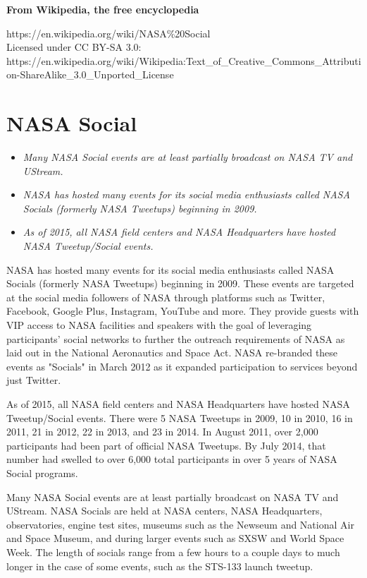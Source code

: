 \textbf{From Wikipedia, the free encyclopedia}

https://en.wikipedia.org/wiki/NASA\%20Social\\
Licensed under CC BY-SA 3.0:\\
https://en.wikipedia.org/wiki/Wikipedia:Text\_of\_Creative\_Commons\_Attribution-ShareAlike\_3.0\_Unported\_License

\section{NASA Social}\label{nasa-social}

\begin{itemize}
\item
  \emph{Many NASA Social events are at least partially broadcast on NASA
  TV and UStream.}
\item
  \emph{NASA has hosted many events for its social media enthusiasts
  called NASA Socials (formerly NASA Tweetups) beginning in 2009.}
\item
  \emph{As of 2015, all NASA field centers and NASA Headquarters have
  hosted NASA Tweetup/Social events.}
\end{itemize}

NASA has hosted many events for its social media enthusiasts called NASA
Socials (formerly NASA Tweetups) beginning in 2009. These events are
targeted at the social media followers of NASA through platforms such as
Twitter, Facebook, Google Plus, Instagram, YouTube and more. They
provide guests with VIP access to NASA facilities and speakers with the
goal of leveraging participants' social networks to further the outreach
requirements of NASA as laid out in the National Aeronautics and Space
Act. NASA re-branded these events as "Socials" in March 2012 as it
expanded participation to services beyond just Twitter.

As of 2015, all NASA field centers and NASA Headquarters have hosted
NASA Tweetup/Social events. There were 5 NASA Tweetups in 2009, 10 in
2010, 16 in 2011, 21 in 2012, 22 in 2013, and 23 in 2014. In August
2011, over 2,000 participants had been part of official NASA Tweetups.
By July 2014, that number had swelled to over 6,000 total participants
in over 5 years of NASA Social programs.

Many NASA Social events are at least partially broadcast on NASA TV and
UStream. NASA Socials are held at NASA centers, NASA Headquarters,
observatories, engine test sites, museums such as the Newseum and
National Air and Space Museum, and during larger events such as SXSW and
World Space Week. The length of socials range from a few hours to a
couple days to much longer in the case of some events, such as the
STS-133 launch tweetup.

